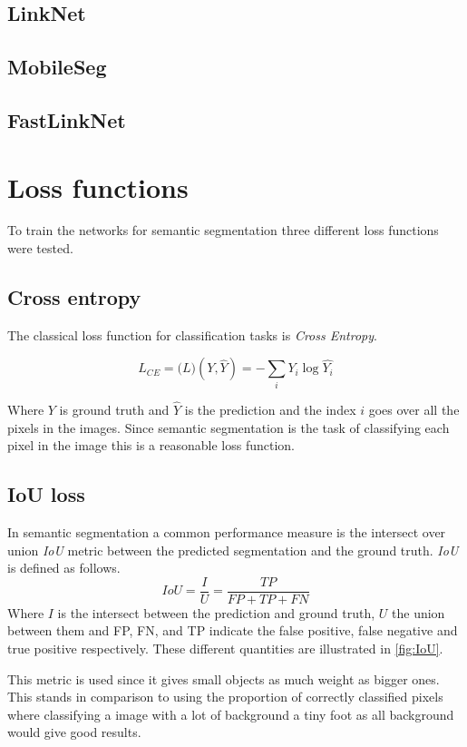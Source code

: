 \documentclass{kththesis}
\begin{document}
\subsection{LinkNet}

\subsection{MobileSeg}

\subsection{FastLinkNet}

\section{Loss functions}
To train the networks for semantic segmentation three different loss functions
were tested.

\subsection{Cross entropy}\label{section:cross_entropy}
The classical loss function for classification  tasks is
\textit{Cross Entropy}.

\[L_{CE} = \mathcal(L)(Y, \hat{Y}) =- \sum_i Y_i \log\hat{Y_i}\]

Where \(Y\) is ground truth and \(\hat{Y}\) is the prediction and the index
\(i\) goes over all the pixels in the images. Since
semantic segmentation is the task of classifying each pixel in the image this is
a reasonable loss function.

\subsection{IoU loss}
In semantic segmentation a common performance measure is the intersect over union
\textit{IoU} metric between the predicted segmentation and the ground truth.
\textit{IoU} is defined as follows.
\[IoU = \frac{I}{U} = \frac{\textit{TP}}{\textit{FP} + \textit{TP} + \textit{FN}}\]
Where \(I\) is the intersect between the prediction and ground truth, \(U\) the union
between them and FP, FN, and TP indicate the false positive, false negative and
true positive respectively. These different quantities are illustrated in \cref{fig:IoU}.

This metric is used since it gives small objects as much weight as bigger ones.
This stands in comparison to using the proportion of correctly classified pixels
where classifying a image with a lot of background a tiny foot as all background
would give good results.
\end{document}
